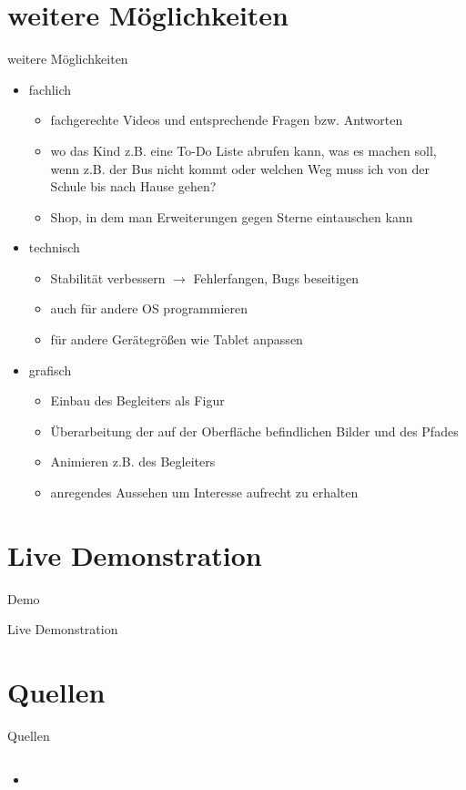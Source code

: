 \documentclass[10pt,fleqn]{beamer}
\begin{document}
\section{weitere Möglichkeiten}
\begin{frame}[t]{weitere Möglichkeiten}
\begin{itemize}
	\item fachlich
	\begin{itemize}
		\item fachgerechte Videos und entsprechende Fragen bzw. Antworten
		\item wo das Kind z.B. eine To-Do Liste abrufen kann, was es machen soll,
		wenn z.B. der Bus nicht kommt oder welchen Weg muss ich von der Schule bis nach
		Hause gehen?
		\item Shop, in dem man Erweiterungen gegen Sterne eintauschen kann
	\end{itemize}
	\item technisch
		\begin{itemize}
		\item Stabilität verbessern $\rightarrow$ Fehlerfangen, Bugs beseitigen
		\item auch für andere OS programmieren
		\item für andere Gerätegrößen wie Tablet anpassen
	\end{itemize}
	\item grafisch
	\begin{itemize}
		\item Einbau des Begleiters als Figur
		\item Überarbeitung der auf der Oberfläche befindlichen Bilder und des Pfades
		\item Animieren z.B. des Begleiters
		\item anregendes Aussehen um Interesse aufrecht zu erhalten
	\end{itemize}
	
\end{itemize}

\end{frame}

\section{Live Demonstration}
\begin{frame}[t]{Demo}
	\begin{center}
		\begin{Huge}
			Live Demonstration
		\end{Huge}
	\end{center}
\end{frame}

\section{Quellen}
\begin{frame}{Quellen}
	\begin{columns}
		\begin{column}{16cm}	
			\begin{itemize}
				\item 
			\end{itemize}
		\end{column}
	\end{columns}
\end{frame}
\end{document}
